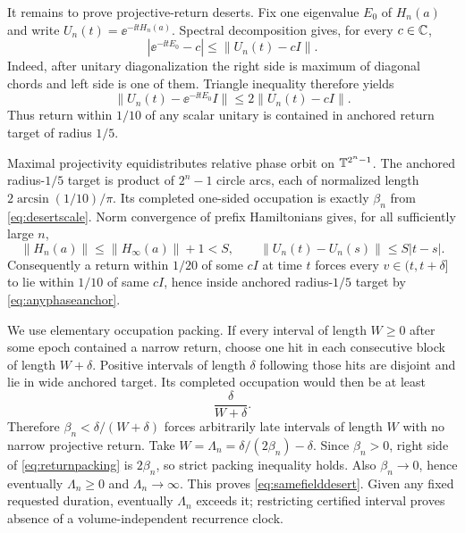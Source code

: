 It remains to prove projective-return deserts.  Fix one eigenvalue $E_0$ of
$H_n(a)$ and write $U_n(t)=\ee^{-\ii tH_n(a)}$.  Spectral decomposition gives,
for every $c\in\mathbb C$,
\begin{equation}
 |\ee^{-\ii tE_0}-c|\le \|U_n(t)-cI\|.               \label{eq:anchorcoordinate}
\end{equation}
Indeed, after unitary diagonalization the right side is maximum of diagonal
chords and left side is one of them.  Triangle inequality therefore yields
\begin{equation}
 \|U_n(t)-\ee^{-\ii tE_0}I\|
 \le 2\|U_n(t)-cI\|.                                 \label{eq:anyphaseanchor}
\end{equation}
Thus return within $1/10$ of any scalar unitary is contained in anchored
return target of radius $1/5$.

Maximal projectivity equidistributes relative phase orbit on
$\mathbb T^{2^n-1}$.  The anchored radius-$1/5$ target is product of
$2^n-1$ circle arcs, each of normalized length
$2\arcsin(1/10)/\pi$.  Its completed one-sided occupation is exactly
$\beta_n$ from \eqref{eq:desertscale}.  Norm convergence of prefix
Hamiltonians gives, for all sufficiently large $n$,
\begin{equation}
 \|H_n(a)\|\le\|H_\infty(a)\|+1<S,
 \qquad
 \|U_n(t)-U_n(s)\|\le S|t-s|.                       \label{eq:uniformreturnspeed}
\end{equation}
Consequently a return within $1/20$ of some $cI$ at time $t$ forces every
$v\in(t,t+\delta]$ to lie within $1/10$ of same $cI$, hence inside anchored
radius-$1/5$ target by \eqref{eq:anyphaseanchor}.

We use elementary occupation packing.  If every interval of length $W\ge0$
after some epoch contained a narrow return, choose one hit in each consecutive
block of length $W+\delta$.  Positive intervals of length $\delta$ following
those hits are disjoint and lie in wide anchored target.  Its completed
occupation would then be at least
\begin{equation}
 \frac{\delta}{W+\delta}.                             \label{eq:returnpacking}
\end{equation}
Therefore $\beta_n<\delta/(W+\delta)$ forces arbitrarily late intervals of
length $W$ with no narrow projective return.  Take
$W=\Lambda_n=\delta/(2\beta_n)-\delta$.  Since $\beta_n>0$,
right side of \eqref{eq:returnpacking} is $2\beta_n$, so strict packing
inequality holds.  Also $\beta_n\to0$, hence eventually $\Lambda_n\ge0$ and
$\Lambda_n\to\infty$.  This proves
\eqref{eq:samefielddesert}.  Given any fixed requested duration, eventually
$\Lambda_n$ exceeds it; restricting certified interval proves absence of a
volume-independent recurrence clock.

